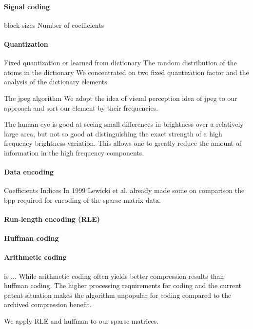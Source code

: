 \paragraph{Signal coding}

block sizes
Number of coefficients


\paragraph{Quantization}
Fixed quantization or learned from dictionary
The random distribution of the atoms in the dictionary 
We concentrated on two fixed quantization factor and the analysis of the
dictionary elements.

The jpeg algorithm 
We adopt the idea of visual perception idea of jpeg to our approach and sort
our element by their frequencies.

The human eye is good at seeing small differences in brightness over a
relatively large area, but not so good at distinguishing the exact strength of a
high frequency brightness variation. This allows one to greatly reduce the
amount of information in the high frequency components. 

\paragraph{Data encoding}
Coefficients
Indices
In 1999 Lewicki et al.\cite{Lewicki1999} already made some on comparison 
the bpp required for encoding of the sparse matrix data.
\cite{Murray2006}

\paragraph{Run-length encoding (RLE)}
\paragraph{Huffman coding}
\paragraph{Arithmetic coding} is ...
While arithmetic coding often yields better compression results than huffman
coding. The higher processing requirements for coding and the current patent
situation makes the algorithm unpopular for coding compared to the archived
compression benefit.

We apply RLE and huffman to our sparse matrices. 


